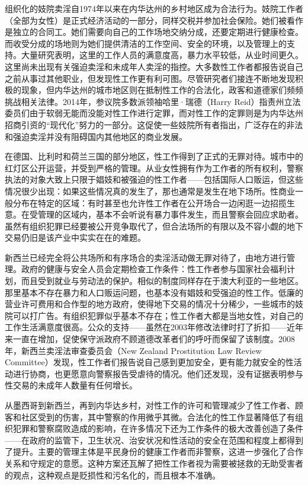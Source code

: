 \documentclass[fontset=fandol, a4paper, 12pt, openright]{ctexbook}
\begin{document}
组织化的妓院卖淫自1974年以来在内华达州的乡村地区成为合法行为。妓院工作者（全部为女性）是正式经济活动的一部分，同样交税并参加社会保险。她们被看作是独立的合同工。她们需要向自己的工作场地交纳分成，还要定期进行健康检查。而收受分成的场地则为她们提供清洁的工作空间、安全的环境，以及管理上的支持。大量研究表明，这里的工作人员的满意度高，暴力水平较低，从业时间更久。这里尚未出现有关强迫卖淫和未成年人卖淫的指控。大多数性工作者都报告说自己之前从事过其他职业，但发现性工作更有利可图。尽管研究者们接连不断地发现积极的现象，但内华达州的城市地区则在抵制性工作的合法化，政客和道德家们频频挑战相关法律。2014年，参议院多数派领袖哈里·瑞德（Harry Reid）指责州立法委员们由于软弱无能而没能对性工作进行定罪，而对性工作的定罪则是为内华达州招商引资的“现代化”努力的一部分。这促使一些妓院所有者指出，广泛存在的非法和强迫卖淫并没有阻碍国内其他地区的商业发展。

在德国、比利时和荷兰三国的部分地区，性工作得到了正式的无罪对待。城市中的红灯区公开运营，并受到严格的管理。从业女性拥有作为工作者的所有权利，警察执法的对象大致上只限于娼妓和被强迫的性工作者——包括国际人口贩运，但这些情况很少出现：如果这些情况真的发生了，那也通常是发生在地下场所。性商业一般分布在特定的区域：有时甚至也允许性工作者在公开场合一边闲逛一边招揽生意。在受管理的区域内，基本不会听说有暴力事件发生，而且警察会回应求助者。虽然有组织犯罪已经要被公开竞争取代了，但合法场所的有限以及不容小觑的地下交易仍旧是该产业中实实在在的难题。

新西兰已经完全将公共场所和有序场合的卖淫活动做无罪对待了，由地方进行管理。政府的健康与安全人员会定期检查工作条件：性工作者参与国家社会福利计划，而且受到就业与劳动法的保护。相似的制度同样存在于澳大利亚的一些地区。那里基本不存在暴力和人口贩运问题，也基本没有娼妓和受强迫的性工作。低廉的营业许可费用和合作型的地方政府，使得地下交易的情况十分稀少，一些城市的妓院可以打广告。有组织犯罪似乎基本不存在；性工作者大都是当地女性，对自己的工作生活满意度很高。公众的支持——虽然在2003年修改法律时打了折扣——近年来一直在增加，促使保守派政府不顾道德改革者们的呼吁而保留了该制度。2008年，新西兰卖淫法审查委员会（New Zealand Prostitution Law Review Committee）发现，性工作者们报告说自己感到更加安全，更有能力就安全的性活动进行协商，也更愿意向警察报告受虐待的情况。他们还发现，没有证据表明参与性交易的未成年人数量有任何增长。

从墨西哥到新西兰，再到内华达乡村，对性工作的许可和管理减少了性工作者、顾客和社区受到的伤害，其中警察的作用微乎其微。合法化的性工作显著降低了有组织犯罪和警察腐败造成的影响，在许多情况下还为工作条件的极大改善创造了条件——在政府的监管下，卫生状况、治安状况和性活动的安全在范围和程度上都得到了提升。主要的管理主体是平民身份的健康工作者而非警察，这进一步强化了合作关系和守规定的意愿。这种方案还瓦解了把性工作者视为需要被拯救的无助受害者的观点，这种观点是贬损性和污名化的，而且根本不准确。
\end{document}
